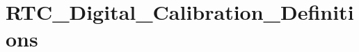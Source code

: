 \hypertarget{group___r_t_c___digital___calibration___definitions}{\section{R\-T\-C\-\_\-\-Digital\-\_\-\-Calibration\-\_\-\-Definitions}
\label{group___r_t_c___digital___calibration___definitions}
}
